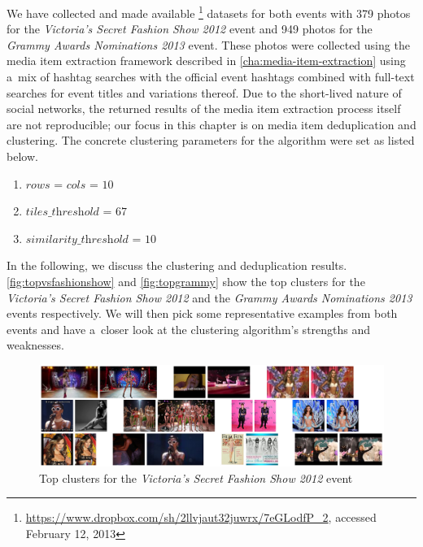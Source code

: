 We have collected and made available%
\footnote{\url{https://www.dropbox.com/sh/2llvjaut32juwrx/7eGLodfP_2},
accessed February 12, 2013}
datasets for both events with
379 photos for the \emph{Victoria's Secret Fashion Show 2012} event 
and 949 photos for the \emph{Grammy Awards Nominations 2013} event.
These photos were collected using the media item extraction framework
described in \autoref{cha:media-item-extraction}
using a~mix of hashtag searches with the official event hashtags combined
with full-text searches for event titles and variations thereof.
Due to the short-lived nature of social networks,
the returned results of the media item extraction process itself
are not reproducible; our focus in this chapter
is on media item deduplication and clustering.
The concrete clustering parameters for the algorithm were set as listed below.

\begin{enumerate}
  \item $\textit{rows}$ = $\textit{cols}$ = $10$
  \item $\textit{tiles\_threshold}$ = $67$
  \item $\textit{similarity\_threshold}$ = $10$
\end{enumerate}

In the following, we discuss the clustering and deduplication results.
\autoref{fig:topvsfashionshow} and \autoref{fig:topgrammy} show the top clusters
for the \emph{Victoria's Secret Fashion Show 2012} and the 
\emph{Grammy Awards Nominations 2013} events respectively.
We will then pick some representative examples from both events
and have a~closer look at the clustering algorithm's strengths and weaknesses.

\begin{figure}[!ht]
  \centering
  \includegraphics[width=1.0\linewidth]{./vsfashionshow_clusters.png}
  \caption{Top clusters for the \emph{Victoria's Secret Fashion Show 2012} event}
  \label{fig:topvsfashionshow}
\end{figure}

